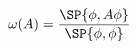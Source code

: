 \begin{equation}
        \label{eq:MyFirstState}
        \omega(A) = \frac{\SP{\phi, A\phi}}{\SP{\phi,\phi}}
    \end{equation}

